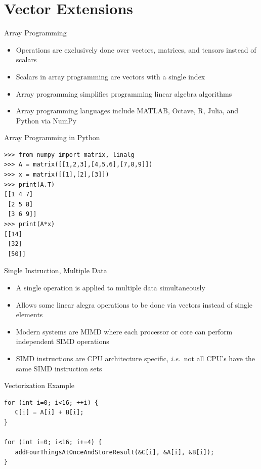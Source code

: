 \section{Vector Extensions}

\begin{frame}{Array Programming}
\begin{itemize}
   \item Operations are exclusively done over vectors, matrices, and tensors instead of scalars
   \item Scalars in array programming are vectors with a single index
   \item Array programming simplifies programming linear algebra algorithms
   \item Array programming languages include MATLAB, Octave, R, Julia, and Python via NumPy
\end{itemize}
\end{frame}

\begin{frame}[fragile]{Array Programming in Python}
\centering\small
\begin{verbatim}
>>> from numpy import matrix, linalg
>>> A = matrix([[1,2,3],[4,5,6],[7,8,9]])
>>> x = matrix([[1],[2],[3]])
>>> print(A.T)
[[1 4 7]
 [2 5 8]
 [3 6 9]]
>>> print(A*x)
[[14]
 [32]
 [50]]
\end{verbatim}
\end{frame}

\begin{frame}{Single Instruction, Multiple Data}
\begin{itemize}
    \item A single operation is applied to multiple data simultaneously
    \item Allows some linear alegra operations to be done via vectors instead of single elements
    \item Modern systems are MIMD where each processor or core can perform independent SIMD operations
    \item SIMD instructions are CPU architecture specific, \textit{i.e.}\ not all CPU's have the same SIMD instruction sets
\end{itemize}
\end{frame}

\begin{frame}[fragile]{Vectorization Example}
\centering
\begin{verbatim}
for (int i=0; i<16; ++i) {
   C[i] = A[i] + B[i];
}

for (int i=0; i<16; i+=4) {
   addFourThingsAtOnceAndStoreResult(&C[i], &A[i], &B[i]);
}
\end{verbatim}
\end{frame}


